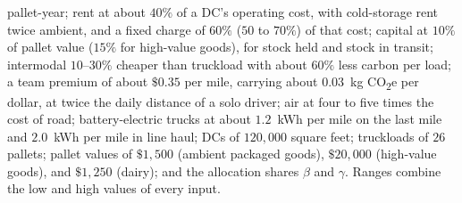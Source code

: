 \documentclass[11pt]{article}
\numberwithin{proposition}{section}
\theoremstyle{definition}
\theoremstyle{remark}
\theoremstyle{plain}
\begin{document}
{pallet-year; rent at about $40\%$ of a DC's operating cost, with cold-storage rent twice
ambient, and a fixed charge of $60\%$ ($50$ to $70\%$) of that cost; capital at $10\%$ of pallet value ($15\%$ for
high-value goods), for stock held and stock in transit; intermodal $10$--$30\%$ cheaper than truckload with about
$60\%$ less carbon per load; a team premium of about $\$0.35$ per mile, carrying about $0.03$~kg
CO\textsubscript{2}e per dollar, at twice the daily distance of a solo driver; air at four to five times the cost of
road; battery-electric trucks at about $1.2$~kWh per mile on the last mile and $2.0$~kWh per mile in line haul;
DCs of $120{,}000$ square feet; truckloads of $26$ pallets; pallet values of $\$1{,}500$ (ambient
packaged goods), $\$20{,}000$ (high-value goods), and $\$1{,}250$ (dairy); and the allocation shares $\beta$ and
$\gamma$. Ranges combine the low and high values of every input.}
\end{document}
